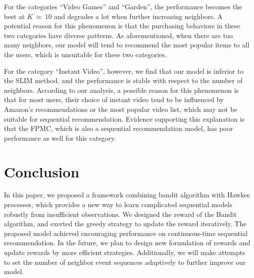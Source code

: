 \documentclass[runningheads]{llncs}
\begin{document}
For the categories ``Video Games'' and ``Garden'', the performance becomes the best at $K \  \approx \ 10 $ and degrades a lot when further increasing neighbors. 
A potential reason for this phenomenon is that the purchasing behaviors in these two categories have diverse patterns. 
As aforementioned, when there are too many neighbors, our model will tend to recommend the most popular items to all the users, which is unsuitable for these two categories.

For the category ``Instant Video'', however, we find that our model is inferior to the SLIM method, and the performance is stable with respect to the number of neighbors. 
According to our analysis, a possible reason for this phenomenon is that for most users, their choice of instant video tend to be influenced by Amazon's recommendations or the most popular video list, which may not be suitable for sequential recommendation. 
Evidence supporting this explanation is that the FPMC, which is also a sequential recommendation model, has poor performance as well for this category.



\section{Conclusion}
In this paper, we proposed a framework combining bandit algorithm with Hawkes processes, which provides a new way to learn complicated sequential models robustly from insufficient observations. 
We designed the reward of the Bandit algorithm, and exerted the greedy strategy to update the reward iteratively. 
The proposed model achieved encouraging performance on continuous-time sequential recommendation.
In the future, we plan to design new formulation of rewards and update rewards by more efficient strategies. 
Additionally, we will make attempts to set the number of neighbor event sequences adaptively to further improve our model.




\clearpage
\newpage
\end{document}
